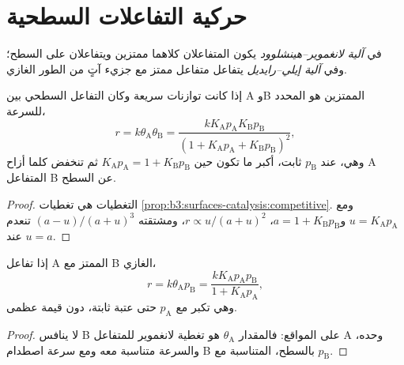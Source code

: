 \section{حركية التفاعلات السطحية}

\begin{definition}\label{def:b3:surfaces-catalysis:mechanisms}
في \emph{آلية لانغموير--هينشلوود}
يكون المتفاعلان كلاهما ممتزين ويتفاعلان على السطح؛ وفي
\emph{آلية إيلي--رايديل} يتفاعل متفاعل ممتز
مع جزيء آتٍ من الطور الغازي.
\end{definition}

\begin{proposition}\label{prop:b3:surfaces-catalysis:lh-rate}
إذا كانت توازنات  سريعة وكان التفاعل السطحي بين A وB الممتزين
هو المحدد للسرعة،
\[
  r = k\theta_{\mathrm A}\theta_{\mathrm B} = \frac{kK_{\mathrm A}p_{\mathrm A}K_{\mathrm B}p_{\mathrm B}}{(1 + K_{\mathrm A}p_{\mathrm A} + K_{\mathrm B}p_{\mathrm B})^2},
\]
وهي، عند $p_{\mathrm B}$ ثابت، أكبر ما تكون حين $K_{\mathrm A}p_{\mathrm A} = 1 + K_{\mathrm B}p_{\mathrm B}$ ثم تنخفض كلما أزاح A المتفاعل B عن
السطح.
\end{proposition}

\begin{proof}
التغطيات هي تغطيات \cref{prop:b3:surfaces-catalysis:competitive}. ومع $u =
K_{\mathrm A}p_{\mathrm A}$ و$a = 1 + K_{\mathrm B}p_{\mathrm B}$، $r \propto u/(a + u)^2$، ومشتقته $(a - u)/(a + u)^3$ تنعدم عند
$u = a$.
\end{proof}

\begin{proposition}\label{prop:b3:surfaces-catalysis:er-rate}
إذا تفاعل A الممتز مع B الغازي،
\[
  r = k\theta_{\mathrm A}p_{\mathrm B} = \frac{kK_{\mathrm A}p_{\mathrm A}p_{\mathrm B}}{1 + K_{\mathrm A}p_{\mathrm A}},
\]
وهي تكبر مع $p_{\mathrm A}$ حتى عتبة ثابتة، دون قيمة عظمى.
\end{proposition}

\begin{proof}
لا ينافس B على المواقع: فالمقدار $\theta_{\mathrm A}$ هو تغطية لانغموير للمتفاعل A وحده، 
والسرعة متناسبة معه ومع سرعة اصطدام B بالسطح،
المتناسبة مع $p_{\mathrm B}$.
\end{proof}

